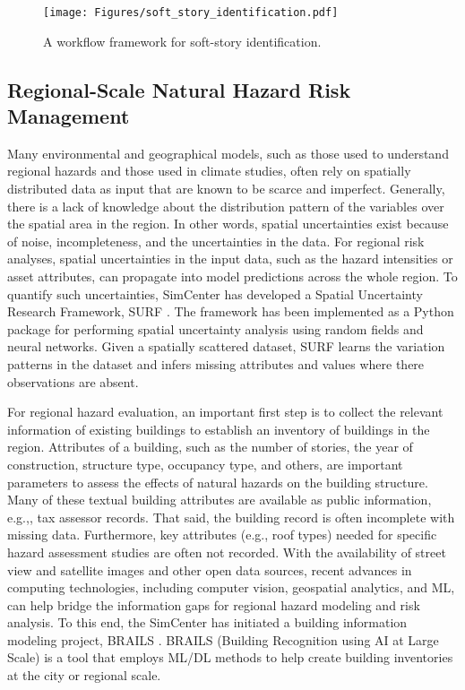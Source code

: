 \begin{figure}[htb]
    \centering
    \texttt{[image: Figures/soft\_story\_identification.pdf]}
    \caption{A workflow framework for soft-story identification.}
    \label{fig:soft_story_identification}
\end{figure}

\subsection{Regional-Scale Natural Hazard Risk Management }

Many environmental and geographical models, such as those used to understand regional hazards and those used in climate studies, often rely on spatially distributed data as input that are known to be scarce and imperfect. Generally, there is a lack of knowledge about the distribution pattern of the variables over the spatial area in the region. In other words, spatial uncertainties exist because of noise, incompleteness, and the uncertainties in the data. For regional risk analyses, spatial uncertainties in the input data, such as the hazard intensities or asset attributes, can propagate into model predictions across the whole region. To quantify such uncertainties, SimCenter has developed a Spatial Uncertainty Research Framework, SURF \citep{wang2019surf}. The framework has been implemented as a Python package for performing spatial uncertainty analysis using random fields and neural networks. Given a spatially scattered dataset, SURF learns the variation patterns in the dataset and infers missing attributes and values where there observations are absent. 

For regional hazard evaluation, an important first step is to collect the relevant information of existing buildings to establish an inventory of buildings in the region. Attributes of a building, such as the number of stories, the year of construction, structure type, occupancy type, and others, are important parameters to assess the effects of natural hazards on the building structure. Many of these textual building attributes are available as public information, e.g.,, tax assessor records. That said, the building record is often incomplete with missing data. Furthermore, key attributes (e.g., roof types) needed for specific hazard assessment studies are often not recorded. With the availability of street view and satellite images and other open data sources, recent advances in computing technologies, including computer vision, geospatial analytics, and ML, can help bridge the information gaps for regional hazard modeling and risk analysis. To this end, the SimCenter has initiated a building information modeling project, BRAILS \citep{yu2019building}. BRAILS (Building Recognition using AI at Large Scale) is a tool that employs ML/DL methods to help create building inventories at the city or regional scale.

